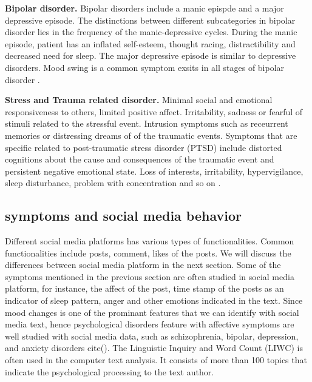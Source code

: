 \textbf{Bipolar disorder.} Bipolar disorders include a manic epispde and a major depressive episode. The distinctions between different subcategories in bipolar disorder lies in the frequency of the manic-depressive cycles. During the manic episode, patient has an inflated self-esteem, thought racing, distractibility and decreased need for sleep. The major depressive episode is similar to depressive disorders. Mood swing is a common symptom exsits in all stages of bipolar disorder \cite{american2013diagnostic}.

\textbf{Stress and Trauma related disorder.} Minimal social and emotional responsiveness to others, limited positive affect. Irritability, sadness or fearful of stimuli related to the stressful event. Intrusion symptoms such as receurrent memories or distressing dreams of of the traumatic events. Symptoms that are specific related to post-traumatic stress disorder (PTSD) include distorted cognitions about the cause and consequences of the traumatic event and persistent negative emotional state. Loss of interests, irritability, hypervigilance, sleep disturbance, problem with concentration and so on \cite{american2013diagnostic}.

\subsection{symptoms and social media behavior}

Different social media platforms has various types of functionalities. Common functionalities include posts, comment, likes of the posts. We will discuss the differences between social media platform in the next section. Some of the symptoms mentioned in the previous section are often studied in social media platform, for instance, the affect of the post, time stamp of the posts as an indicator of sleep pattern, anger and other emotions indicated in the text. Since mood changes is one of the prominant features that we can identify with social media text, hence psychological disorders feature with affective symptoms are well studied with social media data, such as schizophrenia, bipolar, depression, and anxiety disorders cite(). The Linguistic Inquiry and Word Count (LIWC) is often used in the computer text analysis. It consists of more than 100 topics that indicate the psychological processing to the text author. 
 

